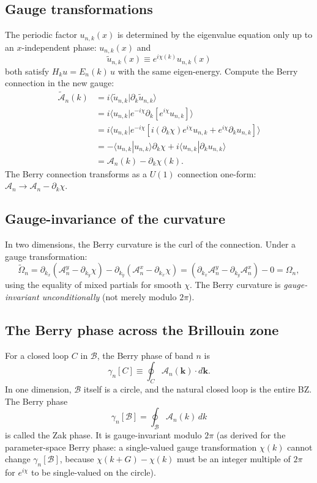 \documentclass[11pt,a4paper]{article}
\begin{document}
\subsection{Gauge transformations}

The periodic factor $u_{n,k}(x)$ is determined by the eigenvalue equation only up to an $x$-independent phase: $u_{n,k}(x)$ and
\[
\tilde u_{n,k}(x) \equiv e^{i\chi(k)} u_{n,k}(x)
\]
both satisfy $H_k u = E_n(k)\, u$ with the same eigen-energy. Compute the Berry connection in the new gauge:
\begin{align*}
\tilde{\mathcal{A}}_n(k) &= i \langle \tilde u_{n,k} | \partial_k \tilde u_{n,k}\rangle \\
&= i \langle u_{n,k} | e^{-i\chi} \partial_k [e^{i\chi} u_{n,k}]\rangle \\
&= i \langle u_{n,k} | e^{-i\chi} [i (\partial_k \chi) e^{i\chi} u_{n,k} + e^{i\chi} \partial_k u_{n,k}]\rangle \\
&= -\langle u_{n,k}|u_{n,k}\rangle \partial_k \chi + i \langle u_{n,k} | \partial_k u_{n,k}\rangle \\
&= \mathcal{A}_n(k) - \partial_k \chi(k).
\end{align*}
The Berry connection transforms as a $U(1)$ connection one-form: $\mathcal{A}_n \to \mathcal{A}_n - \partial_k\chi$.

\subsection{Gauge-invariance of the curvature}

In two dimensions, the Berry curvature is the curl of the connection. Under a gauge transformation:
\[
\tilde\Omega_n = \partial_{k_x}(\mathcal{A}_n^y - \partial_{k_y}\chi) - \partial_{k_y}(\mathcal{A}_n^x - \partial_{k_x}\chi)
= (\partial_{k_x} \mathcal{A}_n^y - \partial_{k_y} \mathcal{A}_n^x) - 0 = \Omega_n,
\]
using the equality of mixed partials for smooth $\chi$. The Berry curvature is \emph{gauge-invariant unconditionally} (not merely modulo $2\pi$).

\subsection{The Berry phase across the Brillouin zone}

For a closed loop $C$ in $\mathcal{B}$, the Berry phase of band $n$ is
\[
\gamma_n[C] \equiv \oint_C \mathcal{A}_n(\mathbf{k}) \cdot d\mathbf{k}.
\]
In one dimension, $\mathcal{B}$ itself is a circle, and the natural closed loop is the entire BZ. The Berry phase
\[
\gamma_n[\mathcal{B}] = \oint_\mathcal{B} \mathcal{A}_n(k)\, dk
\]
is called the Zak phase. It is gauge-invariant modulo $2\pi$ (as derived for the parameter-space Berry phase: a single-valued gauge transformation $\chi(k)$ cannot change $\gamma_n[\mathcal{B}]$, because $\chi(k+G) - \chi(k)$ must be an integer multiple of $2\pi$ for $e^{i\chi}$ to be single-valued on the circle).
\end{document}
